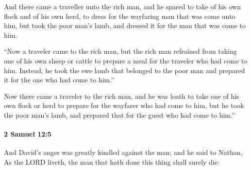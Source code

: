 			\begin{versebox}
					\item[BHS] 
					\item[ASV] And there came a traveller unto the rich man, and he spared to take of his own flock and of his own herd, to dress for the wayfaring man that was come unto him, but took the poor man's lamb, and dressed it for the man that was come to him.
					\item[NIV] “Now a traveler came to the rich man, but the rich man refrained from taking one of his own sheep or cattle to prepare a meal for the traveler who had come to him. Instead, he took the ewe lamb that belonged to the poor man and prepared it for the one who had come to him.”
					\item[NRSV] Now there came a traveler to the rich man, and he was loath to take one of his own flock or herd to prepare for the wayfarer who had come to him, but he took the poor man’s lamb, and prepared that for the guest who had come to him.”
			\end{versebox}

		\paragraph{2 Samuel 12:5} %
			\label{2SAMUEL-12-5}

			And David’s anger was greatly kindled against the man; and he said to Nathan, As the LORD liveth, the man that hath done this thing shall surely die:

